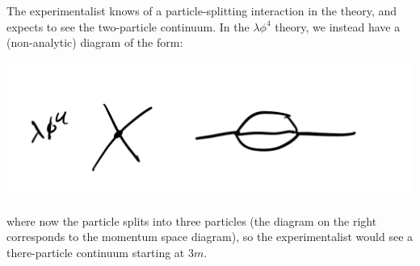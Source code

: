 The experimentalist knows of a particle-splitting interaction in the theory, and expects to see the two-particle continuum. In the $\lambda \phi^4$ theory, we instead have a (non-analytic) diagram of the form:

\begin{center}
    \includegraphics[scale=0.3]{Lectures/Figures/lec13-phi4.png}
\end{center}

where now the particle splits into three particles (the diagram on the right corresponds to the momentum space diagram), so the experimentalist would see a there-particle continuum starting at $3m$.

